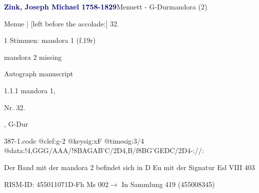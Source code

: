 \documentclass[twocolumn, 12pt]{book}
\begin{document}
\par \vspace{16pt} \textcolor{darkblue}{\textbf{Zink, Joseph Michael  1758-1829}}\hfillplus{\textbf{[387]}}\newline Menuett - G-Dur\newline mandora (2)
\par \begin{itshape}[f.19r, at left:] Menue | [left before the accolade:] 32.\end{itshape} 
\par \textcolor{darkblue}{}  1 Stimmen: mandora 1  (f.19r)\newline \begin{small} mandora 2 missing\end{small} \newline Autograph manuscript
\par 1.1.1  mandora 1, \begin{itshape}Nr. 32.\end{itshape}, G-Dur  
\begin{filecontents*}{387-1.code}
@clef:g-2
@keysig:xF
@timesig:3/4
@data:!4,GGG/AAA/!8BAGAB'C/2D4,B/f8BG'GEDC/2D4-://:
\end{filecontents*}
\newline %
\par Der Band mit der mandora 2 befindet sich in D Eu mit der Signatur Esl VIII 403
\par RISM-ID: 455011071\newline D-Fh  Ms 002\newline $\rightarrow$ In Sammlung 419 (455008345)
      
\end{document}
